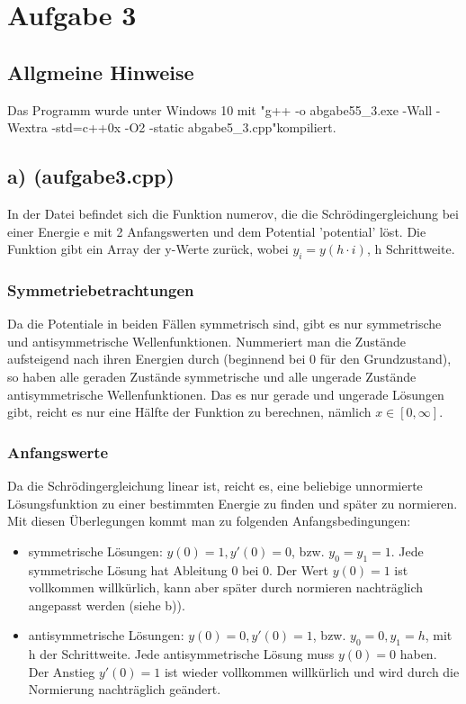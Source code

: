 \documentclass{scrreprt}
\begin{document}
\chapter*{Aufgabe 3}
\section*{Allgmeine Hinweise}
Das Programm wurde unter Windows 10 mit "g++ -o abgabe55\_3.exe -Wall -Wextra -std=c++0x -O2 -static abgabe5\_3.cpp"\;kompiliert.

\section*{a) (aufgabe3.cpp)}
In der Datei befindet sich die Funktion numerov, die die Schrödingergleichung bei einer Energie e mit 2 Anfangswerten und dem Potential 'potential' löst. Die Funktion gibt ein Array der y-Werte zurück, wobei $y_i = y(h \cdot i)$, h Schrittweite.

\subsection*{Symmetriebetrachtungen}
Da die Potentiale in beiden Fällen symmetrisch sind, gibt es nur symmetrische und antisymmetrische Wellenfunktionen. Nummeriert man die Zustände aufsteigend nach ihren Energien durch (beginnend bei 0 für den Grundzustand), so haben alle geraden Zustände symmetrische und alle ungerade Zustände antisymmetrische Wellenfunktionen. Das es nur gerade und ungerade Lösungen gibt, reicht es nur eine Hälfte der Funktion zu berechnen, nämlich $x\in [0,\infty]$.\\

\subsection*{Anfangswerte}
Da die Schrödingergleichung linear ist, reicht es, eine beliebige unnormierte Lösungsfunktion zu einer bestimmten Energie zu finden und später zu normieren.
Mit diesen Überlegungen kommt man zu folgenden Anfangsbedingungen:
\begin{itemize}
	\item symmetrische Lösungen: $y(0) = 1, y'(0)=0$, bzw. $y_0 = y_1 = 1$. Jede symmetrische Lösung hat Ableitung 0 bei 0. Der Wert $y(0) = 1$ ist vollkommen willkürlich, kann aber später durch normieren nachträglich angepasst werden (siehe b)).
	\item antisymmetrische Lösungen: $y(0) = 0, y'(0) = 1$, bzw. $y_0 = 0, y_1 = h$, mit h der Schrittweite. Jede antisymmetrische Lösung muss $y(0) = 0$ haben. Der Anstieg $y'(0) = 1$ ist wieder vollkommen willkürlich und wird durch die Normierung nachträglich geändert. 
\end{itemize}
\end{document}
